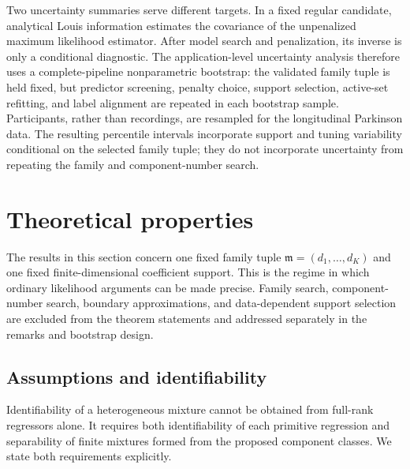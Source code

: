 \documentclass[a4paper,fleqn]{cas-sc}
\newcommand{\model}{\mathfrak m}
\begin{document}
Two uncertainty summaries serve different targets. In a fixed regular candidate, analytical Louis information estimates the covariance of the unpenalized maximum likelihood estimator. After model search and penalization, its inverse is only a conditional diagnostic. The application-level uncertainty analysis therefore uses a complete-pipeline nonparametric bootstrap: the validated family tuple is held fixed, but predictor screening, penalty choice, support selection, active-set refitting, and label alignment are repeated in each bootstrap sample. Participants, rather than recordings, are resampled for the longitudinal Parkinson data. The resulting percentile intervals incorporate support and tuning variability conditional on the selected family tuple; they do not incorporate uncertainty from repeating the family and component-number search.

\section{Theoretical properties}
\label{sec:theory}

The results in this section concern one fixed family tuple $\model=(d_1,\ldots,d_K)$ and one fixed finite-dimensional coefficient support. This is the regime in which ordinary likelihood arguments can be made precise. Family search, component-number search, boundary approximations, and data-dependent support selection are excluded from the theorem statements and addressed separately in the remarks and bootstrap design.

\subsection{Assumptions and identifiability}
\label{sec:assumptions}

Identifiability of a heterogeneous mixture cannot be obtained from full-rank regressors alone. It requires both identifiability of each primitive regression and separability of finite mixtures formed from the proposed component classes. We state both requirements explicitly.
\end{document}
